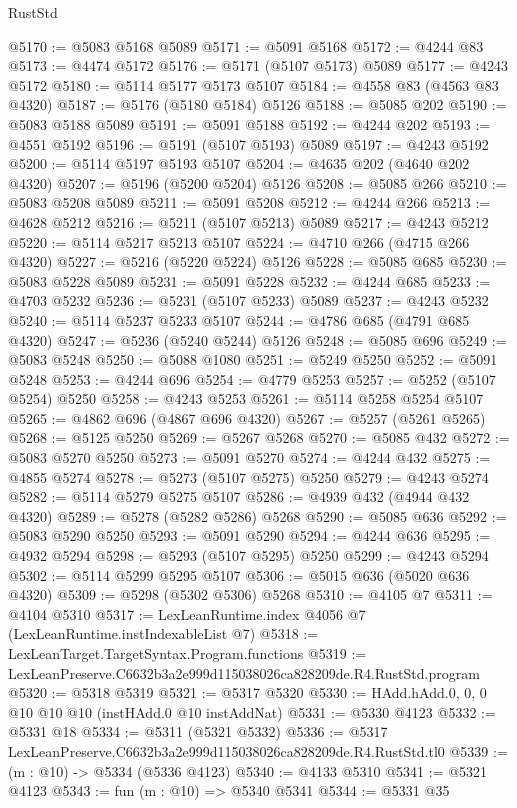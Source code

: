 \begin{lexlean}{RustStd}
\begin{coremodule}
@5170 := @5083 @5168 @5089
@5171 := @5091 @5168
@5172 := @4244 @83
@5173 := @4474 @5172
@5176 := @5171 (@5107 @5173) @5089
@5177 := @4243 @5172
@5180 := @5114 @5177 @5173 @5107
@5184 := @4558 @83 (@4563 @83 @4320)
@5187 := @5176 (@5180 @5184) @5126
@5188 := @5085 @202
@5190 := @5083 @5188 @5089
@5191 := @5091 @5188
@5192 := @4244 @202
@5193 := @4551 @5192
@5196 := @5191 (@5107 @5193) @5089
@5197 := @4243 @5192
@5200 := @5114 @5197 @5193 @5107
@5204 := @4635 @202 (@4640 @202 @4320)
@5207 := @5196 (@5200 @5204) @5126
@5208 := @5085 @266
@5210 := @5083 @5208 @5089
@5211 := @5091 @5208
@5212 := @4244 @266
@5213 := @4628 @5212
@5216 := @5211 (@5107 @5213) @5089
@5217 := @4243 @5212
@5220 := @5114 @5217 @5213 @5107
@5224 := @4710 @266 (@4715 @266 @4320)
@5227 := @5216 (@5220 @5224) @5126
@5228 := @5085 @685
@5230 := @5083 @5228 @5089
@5231 := @5091 @5228
@5232 := @4244 @685
@5233 := @4703 @5232
@5236 := @5231 (@5107 @5233) @5089
@5237 := @4243 @5232
@5240 := @5114 @5237 @5233 @5107
@5244 := @4786 @685 (@4791 @685 @4320)
@5247 := @5236 (@5240 @5244) @5126
@5248 := @5085 @696
@5249 := @5083 @5248
@5250 := @5088 @1080
@5251 := @5249 @5250
@5252 := @5091 @5248
@5253 := @4244 @696
@5254 := @4779 @5253
@5257 := @5252 (@5107 @5254) @5250
@5258 := @4243 @5253
@5261 := @5114 @5258 @5254 @5107
@5265 := @4862 @696 (@4867 @696 @4320)
@5267 := @5257 (@5261 @5265)
@5268 := @5125 @5250
@5269 := @5267 @5268
@5270 := @5085 @432
@5272 := @5083 @5270 @5250
@5273 := @5091 @5270
@5274 := @4244 @432
@5275 := @4855 @5274
@5278 := @5273 (@5107 @5275) @5250
@5279 := @4243 @5274
@5282 := @5114 @5279 @5275 @5107
@5286 := @4939 @432 (@4944 @432 @4320)
@5289 := @5278 (@5282 @5286) @5268
@5290 := @5085 @636
@5292 := @5083 @5290 @5250
@5293 := @5091 @5290
@5294 := @4244 @636
@5295 := @4932 @5294
@5298 := @5293 (@5107 @5295) @5250
@5299 := @4243 @5294
@5302 := @5114 @5299 @5295 @5107
@5306 := @5015 @636 (@5020 @636 @4320)
@5309 := @5298 (@5302 @5306) @5268
@5310 := @4105 @7
@5311 := @4104 @5310
@5317 := LexLeanRuntime.index @4056 @7 (LexLeanRuntime.instIndexableList @7)
@5318 := LexLeanTarget.TargetSyntax.Program.functions
@5319 := LexLeanPreserve.C6632b3a2e999d115038026ca828209de.R4.RustStd.program
@5320 := @5318 @5319
@5321 := @5317 @5320
@5330 := HAdd.hAdd.{0, 0, 0} @10 @10 @10 (instHAdd.{0} @10 instAddNat)
@5331 := @5330 @4123
@5332 := @5331 @18
@5334 := @5311 (@5321 @5332)
@5336 := @5317 LexLeanPreserve.C6632b3a2e999d115038026ca828209de.R4.RustStd.tl0
@5339 := (m : @10) -> @5334 (@5336 @4123)
@5340 := @4133 @5310
@5341 := @5321 @4123
@5343 := fun (m : @10) => @5340 @5341
@5344 := @5331 @35

\end{coremodule}
\end{lexlean}
